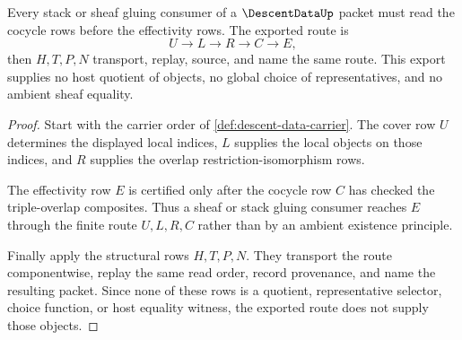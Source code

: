 \begin{theorem}\label{thm:descent-data-cocycle-effectivity-route}
Every stack or sheaf gluing consumer of a $\DescentDataUp$ packet must read the cocycle rows before the effectivity rows. The exported route is
$$
U\longrightarrow L\longrightarrow R\longrightarrow C\longrightarrow E,
$$
then $H,T,P,N$ transport, replay, source, and name the same route. This export supplies no host quotient of objects, no global choice of representatives, and no ambient sheaf equality.
\end{theorem}
\begin{proof}
Start with the carrier order of \autoref{def:descent-data-carrier}. The cover row $U$ determines the displayed local indices, $L$ supplies the local objects on those indices, and $R$ supplies the overlap restriction-isomorphism rows.

The effectivity row $E$ is certified only after the cocycle row $C$ has checked the triple-overlap composites. Thus a sheaf or stack gluing consumer reaches $E$ through the finite route $U,L,R,C$ rather than by an ambient existence principle.

Finally apply the structural rows $H,T,P,N$. They transport the route componentwise, replay the same read order, record provenance, and name the resulting packet. Since none of these rows is a quotient, representative selector, choice function, or host equality witness, the exported route does not supply those objects.
\end{proof}

\begin{closurestatus}{\DescentDataUp}
  \theoryclosure{\seedClosure}
  \formalstatus{\unformalizedV}
\end{closurestatus}
